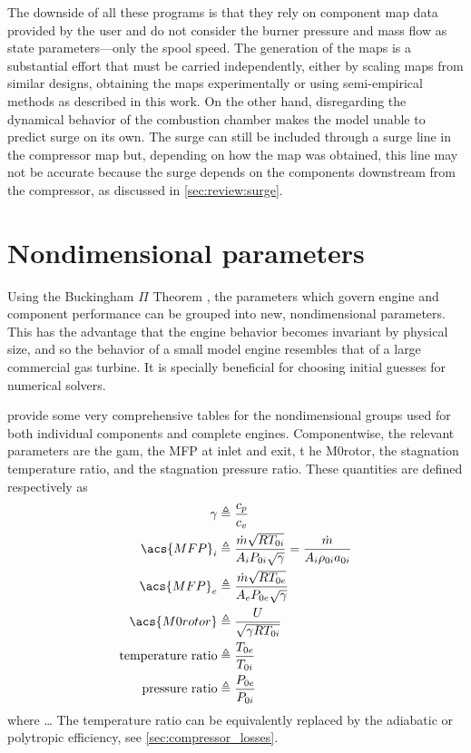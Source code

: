 \documentclass[tcc]{subfiles}
\begin{document}
The downside of all these programs is that they rely on component map data provided by the user 
and do not consider the burner pressure and mass flow as state parameters---only the spool speed.
The generation of the maps is a substantial effort that must be carried independently, 
either by scaling maps from similar designs, obtaining the maps experimentally 
or using semi-empirical methods as described in this work. 
On the other hand, disregarding the dynamical behavior of the combustion chamber makes the model unable to predict surge on its own. The surge can still be included through a surge line in the compressor map but,
depending on how the map was obtained, this line may not be accurate because the surge depends on the components downstream from the compressor, as discussed in \cref{sec:review:surge}.

\section{Nondimensional parameters}
\label{sec:nondimensional}

Using the Buckingham $\Pi$ Theorem \cite{Buckingham1914},
the parameters which govern engine and component performance can be grouped into new, nondimensional parameters. 
This has the advantage that the engine behavior becomes invariant by physical size, and so the behavior of a small model engine resembles that of a large commercial gas turbine. 
It is specially beneficial for choosing initial guesses for numerical solvers.

\textcite[chapter 4]{walsh2004gas} provide some very comprehensive tables 
for the nondimensional groups used for both individual components and complete engines.
Componentwise, the relevant parameters are the \acl{gam}, the \acl{MFP} at inlet and exit, t
he \acl{M0rotor}, the stagnation temperature ratio, and the stagnation pressure ratio. 
These quantities are defined respectively as
\begin{align}
    \gamma &\triangleq \frac{c_p}{c_v} \\
    \acs{MFP}_i &\triangleq \MFP{i} = \MFPalt{i} \label{eqn:MFPi}\\
    \acs{MFP}_e &\triangleq \MFP{e} \\
    \acs{M0rotor} &\triangleq \frac{U}{\sqrt{\gamma R T_{0i}}} \\
    \text{temperature ratio}&\triangleq\tr{0e}{0i} \\
    \text{pressure ratio}&\triangleq\pr{0e}{0i}
\end{align}
where \ldots
The temperature ratio can be equivalently replaced by the adiabatic or polytropic efficiency,
see \cref{sec:compressor_losses}.
\end{document}
